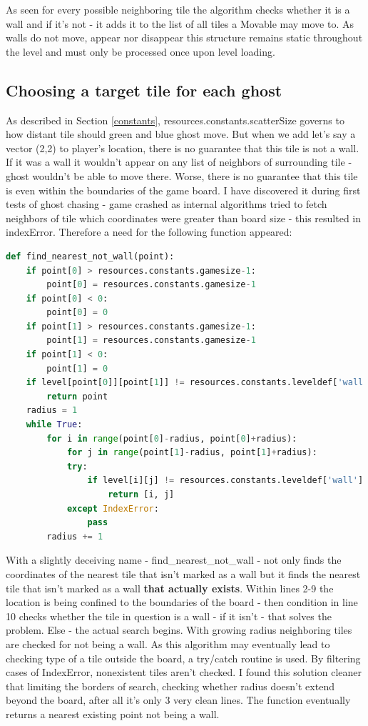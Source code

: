 \documentclass[11pt,a4paper]{report}
\newcommand{\dsubsection}[1]{\FloatBarrier \subsection{#1}}
\begin{document}
				As seen for every possible neighboring tile the algorithm checks whether it is a wall and if it's not - it adds it to the list of all tiles a Movable may move to. As walls do not move, appear nor disappear this structure remains static throughout the level and must only be processed once upon level loading.
			\dsubsection{Choosing a target tile for each ghost}
				As described in Section \ref{constants}, resources.constants.scatterSize governs to how distant tile should green and blue ghost move. But when we add let's say a vector (2,2) to player's location, there is no guarantee that this tile is not a wall. If it was a wall it wouldn't appear on any list of neighbors of surrounding tile - ghost wouldn't be able to move there. Worse, there is no guarantee that this tile is even within the boundaries of the game board. I have discovered it during first tests of ghost chasing - game crashed as internal algorithms tried to fetch neighbors of tile which coordinates were greater than board size - this resulted in indexError. Therefore a need for the following function appeared:
				\begin{lstlisting}[language = Python]
def find_nearest_not_wall(point):
	if point[0] > resources.constants.gamesize-1:
		point[0] = resources.constants.gamesize-1
	if point[0] < 0:
		point[0] = 0
	if point[1] > resources.constants.gamesize-1:
		point[1] = resources.constants.gamesize-1
	if point[1] < 0:
		point[1] = 0
	if level[point[0]][point[1]] != resources.constants.leveldef['wall']:
		return point
	radius = 1
	while True:
		for i in range(point[0]-radius, point[0]+radius):
			for j in range(point[1]-radius, point[1]+radius):
			try:
				if level[i][j] != resources.constants.leveldef['wall']:
					return [i, j]
			except IndexError:
				pass
		radius += 1
				\end{lstlisting}
				With a slightly deceiving name - find\_nearest\_not\_wall - not only finds the coordinates of the nearest tile that isn't marked as a wall but it finds the nearest tile that isn't marked as a wall \textbf{that actually exists}.
				Within lines 2-9 the location is being confined to the boundaries of the board - then condition in line 10 checks whether the tile in question is a wall - if it isn't - that solves the problem. Else - the actual search begins. With growing radius neighboring tiles are checked for not being a wall. As this algorithm may eventually lead to checking type of a tile outside the board, a try/catch routine is used. By filtering cases of IndexError, nonexistent tiles aren't checked. I found this solution cleaner that limiting the borders of search, checking whether radius doesn't extend beyond the board, after all it's only 3 very clean lines. The function eventually returns a nearest existing point not being a wall.
\end{document}
